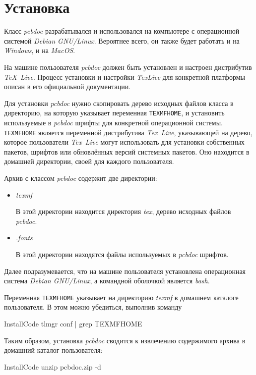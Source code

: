 
\section{Установка}

Класс \emph{pcbdoc} разрабатывался и использовался на компьютере с операционной
системой \emph{Debian GNU/Linux}. Вероятнее всего, он также будет работать и на
\emph{Windows}, и на \emph{MacOS}.

На машине пользователя \emph{pcbdoc} должен быть установлен и настроен
дистрибутив \emph{TeX~Live}. Процесс установки и настройки \emph{TexLive}
для конкретной платформы описан в его официальной документации.

Для установки \emph{pcbdoc} нужно скопировать дерево исходных файлов класса в
директорию, на которую указывает переменная \texttt{TEXMFHOME}, и установить
используемые в \emph{pcbdoc} шрифты для конкретной операционной системы.
\texttt{TEXMFHOME} является переменной дистрибутива \emph{Tex~Live},
указывающей на дерево, которое пользователи \emph{Tex~Live} могут использовать
для установки собственных пакетов, шрифтов или обновлённых версий системных
пакетов. Оно находится в домашней директории, своей для каждого пользователя.

Архив с классом \emph{pcbdoc} содержит две директории:
\begin{itemize}
  \item \emph{texmf}

  В этой директории находится директория \emph{tex}, дерево исходных файлов
  \emph{pcbdoc}.

  \item \emph{.fonts}

  В этой директории находятся файлы используемых в \emph{pcbdoc} шрифтов.

\end{itemize}

Далее подразумевается, что на машине пользователя установлена операционная
система \emph{Debian GNU/Linux}, а командной оболочкой является \emph{bash}.

Переменная \texttt{TEXMFHOME} указывает на директорию \emph{texmf} в домашнем
каталоге пользователя. В этом можно убедиться, выполнив команду

\begin{SaveVerbatim}{InstallCode}
  tlmgr conf | grep TEXMFHOME
\end{SaveVerbatim}
\colorbox{terminalcolor}{}

Таким образом, установка \emph{pcbdoc} сводится к извлечению содержимого архива
в домашний каталог пользователя:

\begin{SaveVerbatim}{InstallCode}
  unzip pcbdoc.zip -d ~
\end{SaveVerbatim}
\colorbox{terminalcolor}{}
